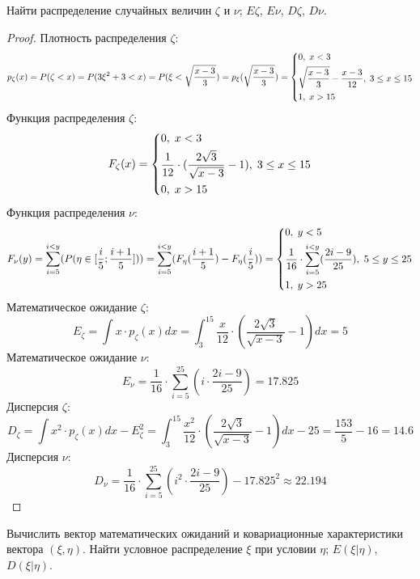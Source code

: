 \begin{problem}
	Найти распределение случайных величин $\zeta$ и $\nu$; $E\zeta$, $E\nu$, $D\zeta$, $D\nu$.
\end{problem}

\begin{proof}
	Плотность распределения $\zeta$:
	\[
		p_\zeta(x) = P(\zeta < x) = P(3\xi^2 + 3 < x) = P(\xi < \sqrt{\frac{x - 3}{3}}) = p_\xi(\sqrt{\frac{x - 3}{3}}) =
		\begin{dcases}
			0, \; x < 3\\
			\sqrt{\frac{x - 3}{3}} - \frac{x - 3}{12}, \; 3 \le x \le 15\\
			1, \; x > 15
		\end{dcases}
	\]
	Функция распределения $\zeta$:
	\[
		F_\zeta(x) =
		\begin{dcases}
			0, \; x < 3\\
			\frac{1}{12} \cdot (\frac{2 \sqrt{3}}{\sqrt{x - 3}} - 1), \; 3 \le x \le 15\\
			0, \; x > 15
		\end{dcases}
	\]
	Функция распределения $\nu$:
	\[
		F_\nu(y) = \sum_{i = 5}^{i < y} (P(\eta \in [\frac{i}{5}; \frac{i + 1}{5}])) = \sum_{i = 5}^{i < y} (F_\eta(\frac{i + 1}{5}) - F_\eta(\frac{i}{5})) =
		\begin{dcases}
			0, \; y < 5\\
			\frac{1}{16} \cdot \sum_{i = 5}^{i < y} (\frac{2i-9}{25}), \; 5 \le y \le 25\\
			1, \; y > 25
		\end{dcases}
	\]
	Математическое ожидание $\zeta$:
	\[
		E_\zeta = \int x \cdot p_\zeta(x) dx = \int_{3}^{15} \frac{x}{12} \cdot (\frac{2 \sqrt{3}}{\sqrt{x - 3}} - 1) dx = 5
	\]
	Математическое ожидание $\nu$:
	\[
		E_\nu = \frac{1}{16} \cdot \sum_{i = 5}^{25} (i \cdot \frac{2i-9}{25}) = 17.825
	\]
	Дисперсия $\zeta$:
	\[
		D_\zeta = \int x^2 \cdot p_\zeta(x) dx - E_\zeta^2 = \int_{3}^{15} \frac{x^2}{12} \cdot (\frac{2 \sqrt{3}}{\sqrt{x - 3}} - 1) dx - 25 = \frac{153}{5} - 16 = 14.6
	\]
	Дисперсия $\nu$:
	\[
		D_\nu = \frac{1}{16} \cdot \sum_{i = 5}^{25} (i^2 \cdot \frac{2i-9}{25}) - 17.825^2 \approx 22.194
	\]
\end{proof}

\begin{problem}
	Вычислить вектор математических ожиданий и ковариационные характеристики вектора $(\xi, \eta)$. Найти условное распределение $\xi$ при условии $\eta$; $E(\xi | \eta)$, $D(\xi | \eta)$.
\end{problem}

